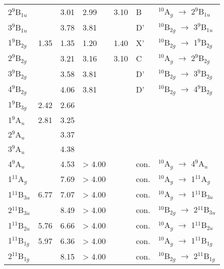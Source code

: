 \begin{refsection}
\begin{table}[htbp!]
\begin{threeparttable}
\begin{tabular}{@{}lllllll@{}}
 2$^9$B$_{1u}$       &         & 3.01   & 2.99       & 3.10   & B    & $^{10}$A$_g$    $\longrightarrow$ 2$^9$B$_{1u}$      \\
 3$^9$B$_{1u}$       &         & 3.78   & 3.81       &        & D'   & $^{10}$B$_{2g}$ $\longrightarrow$ 3$^9$B$_{1u}$      \\
 1$^9$B$_{2g}$       & 1.35    & 1.35   & 1.20       & 1.40   & X'   & $^{10}$B$_{2g}$ $\longrightarrow$ 1$^9$B$_{2g}$      \\
 2$^9$B$_{2g}$       &         & 3.21   & 3.16       & 3.10   & C    & $^{10}$A$_g$    $\longrightarrow$ 2$^9$B$_{2g}$      \\
 3$^9$B$_{2g}$       &         & 3.58   & 3.81       &        & D'   & $^{10}$B$_{2g}$ $\longrightarrow$ 3$^9$B$_{2g}$      \\
 4$^9$B$_{2g}$       &         & 4.06   & 3.81       &        & D'   & $^{10}$B$_{2g}$ $\longrightarrow$ 4$^9$B$_{2g}$      \\
 1$^9$B$_{3g}$       & 2.42    & 2.66   &            &        &      &                									   \\
 1$^9$A$_u$          & 2.81    & 3.25   &            &        &      &                									   \\
 2$^9$A$_u$          &         & 3.37   &            &        &      &                									   \\
 3$^9$A$_u$          &         & 4.38   &            &        &      &                									   \\
 4$^9$A$_u$          &         & 4.53   & > 4.00     &        & con. & $^{10}$A$_g$     $\longrightarrow$ 4$^9$A$_u$     \\
 1$^{11}$A$_g$       &         & 7.69   & > 4.00     &        & con. & $^{10}$A$_g$     $\longrightarrow$ 1$^{11}$A$_g$     \\
 1$^{11}$B$_{3u}$    & 6.77    & 7.07   & > 4.00     &        & con. & $^{10}$A$_g$     $\longrightarrow$ 1$^{11}$B$_{3u}$  \\
 2$^{11}$B$_{3u}$    &         & 8.49   & > 4.00     &        & con. & $^{10}$B$_{2g}$  $\longrightarrow$ 2$^{11}$B$_{3u}$  \\
 1$^{11}$B$_{2u}$    & 5.76    & 6.66   & > 4.00     &        & con. & $^{10}$A$_g$     $\longrightarrow$ 1$^{11}$B$_{2u}$  \\
 1$^{11}$B$_{1g}$    & 5.97    & 6.36   & > 4.00     &        & con. & $^{10}$A$_g$     $\longrightarrow$ 1$^{11}$B$_{1g}$  \\
 2$^{11}$B$_{1g}$    &         & 8.15   & > 4.00     &        & con. & $^{10}$B$_{2g}$  $\longrightarrow$ 2$^{11}$B$_{1g}$  \\

\end{tabular}
\end{threeparttable}
\end{table}
\end{refsection}
